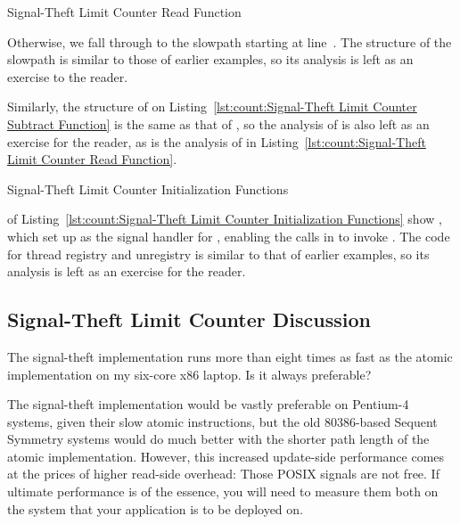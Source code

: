 \begin{listing}

\caption{Signal-Theft Limit Counter Read Function}
\label{lst:count:Signal-Theft Limit Counter Read Function}
\end{listing}

\begin{fcvref}
Otherwise, we fall through to the slowpath starting at line~.
The structure of the slowpath is similar to those of earlier examples,
so its analysis is left as an exercise to the reader.
\end{fcvref}
Similarly, the structure of  on
Listing~\ref{lst:count:Signal-Theft Limit Counter Subtract Function}
is the same
as that of , so the analysis of  is also
left as an exercise for the reader, as is the analysis of
 in
Listing~\ref{lst:count:Signal-Theft Limit Counter Read Function}.

\begin{listing}

\caption{Signal-Theft Limit Counter Initialization Functions}
\label{lst:count:Signal-Theft Limit Counter Initialization Functions}
\end{listing}

\begin{fcvref}
 of
Listing~\ref{lst:count:Signal-Theft Limit Counter Initialization Functions}
show , which set up 
as the signal handler for ,
enabling the  calls in 
to invoke .
The code for thread registry and unregistry is similar to that of
earlier examples, so its analysis is left as an exercise for the
reader.
\end{fcvref}

\subsection{Signal-Theft Limit Counter Discussion}

The signal-theft implementation runs more than eight times as fast as the
atomic implementation on my six-core x86 laptop.
Is it always preferable?

The signal-theft implementation would be vastly preferable on Pentium-4
systems, given their slow atomic instructions, but the old 80386-based
Sequent Symmetry systems would do much better with the shorter path
length of the atomic implementation.
However, this increased update-side performance comes at the
prices of higher read-side overhead: Those POSIX signals are not free.
If ultimate performance is of the essence, you will need to measure
them both on the system that your application is to be deployed on.

